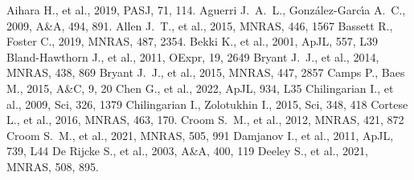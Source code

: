 \documentclass[a4paper,fleqn,usenatbib]{mnras}
\begin{document}





%

\begin{thebibliography}{99}

 Aihara H., et al., 2019, PASJ, 71, 114.
  Aguerri J.~A.~L., Gonz{\'a}lez-Garc{\'\i}a A.~C., 2009, A\&A, 494, 891. 
 Allen J.~T., et al., 2015, MNRAS, 446, 1567 
 Bassett R., Foster C., 2019, MNRAS, 487, 2354. 
 Bekki K., et al., 2001, ApJL, 557, L39
 Bland-Hawthorn J., et al., 2011, OExpr, 19, 2649 
 Bryant J.~J., et al., 2014, MNRAS, 438, 869 
 Bryant J.~J., et al., 2015, MNRAS, 447, 2857
 Camps P., Baes M., 2015, A\&C, 9, 20
 Chen G., et al., 2022, ApJL, 934, L35
 Chilingarian I., et al., 2009, Sci, 326, 1379
 Chilingarian I., Zolotukhin I., 2015, Sci, 348, 418
 Cortese L., et al., 2016, MNRAS, 463, 170. 
 Croom S.~M., et al., 2012, MNRAS, 421, 872 
 Croom S.~M., et al., 2021, MNRAS, 505, 991 
 Damjanov I., et al., 2011, ApJL, 739, L44
 De Rijcke S., et al., 2003, A\&A, 400, 119
 Deeley S., et al., 2021, MNRAS, 508, 895. 

\end{thebibliography}
\end{document}
